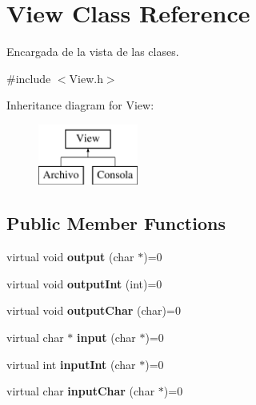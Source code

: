 \hypertarget{class_view}{}\section{View Class Reference}
\label{class_view}


Encargada de la vista de las clases.  




{\ttfamily \#include $<$View.\+h$>$}

Inheritance diagram for View\+:\begin{figure}[H]
\begin{center}
\leavevmode
\includegraphics[height=2.000000cm]{class_view}
\end{center}
\end{figure}
\subsection*{Public Member Functions}
\begin{DoxyCompactItemize}
\item 
virtual void {\bfseries output} (char $\ast$)=0\hypertarget{class_view_ab8a6c58a49ba70ecca1677fdaa840b39}{}\label{class_view_ab8a6c58a49ba70ecca1677fdaa840b39}

\item 
virtual void {\bfseries output\+Int} (int)=0\hypertarget{class_view_aa02cebb4b67e05cbf3d7cf30c3ecbb3e}{}\label{class_view_aa02cebb4b67e05cbf3d7cf30c3ecbb3e}

\item 
virtual void {\bfseries output\+Char} (char)=0\hypertarget{class_view_a944f40363167dfccda0408b462fe7593}{}\label{class_view_a944f40363167dfccda0408b462fe7593}

\item 
virtual char $\ast$ {\bfseries input} (char $\ast$)=0\hypertarget{class_view_adcfa16ba54323c94242f60d35c58613c}{}\label{class_view_adcfa16ba54323c94242f60d35c58613c}

\item 
virtual int {\bfseries input\+Int} (char $\ast$)=0\hypertarget{class_view_ae9e0b58ebd710046411e09eae8bc8224}{}\label{class_view_ae9e0b58ebd710046411e09eae8bc8224}

\item 
virtual char {\bfseries input\+Char} (char $\ast$)=0\hypertarget{class_view_aac8eb1e5438a50dcb8334c6805ced205}{}\label{class_view_aac8eb1e5438a50dcb8334c6805ced205}

\end{DoxyCompactItemize}


